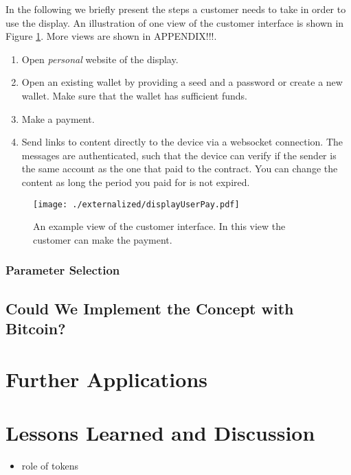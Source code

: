 In the following we briefly present the steps a customer needs to take in order to use the display. An illustration of one view of the customer interface is shown in Figure \ref{fig:payview}. More views are shown in APPENDIX!!!.

\begin{enumerate}
\item Open \emph{personal} website of the display.
\item Open an existing wallet by providing a seed and a password or create a new wallet. Make sure that the wallet has sufficient funds.
\item Make a payment.
\item Send links to content directly to the device via a websocket connection. The messages are authenticated, such that the device can verify if the sender is the same account as the one that paid to the contract. You can change the content as long the period you paid for is not expired.
\end{enumerate}  



\begin{figure}
 \centering
 \texttt{[image: ./externalized/displayUserPay.pdf]}
 \caption{An example view of the customer interface. In this view the customer can make the payment.}
 \label{fig:payview}
 \end{figure}




 \subsubsection{Parameter Selection}

\subsection{Could We Implement the Concept with Bitcoin?}

\section{Further Applications}




\section{Lessons Learned and Discussion}


\begin{itemize}
\item role of tokens

\end{itemize}

